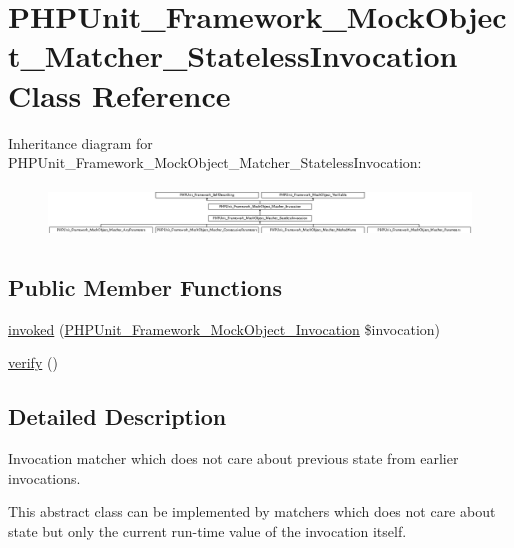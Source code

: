 \hypertarget{class_p_h_p_unit___framework___mock_object___matcher___stateless_invocation}{}\section{P\+H\+P\+Unit\+\_\+\+Framework\+\_\+\+Mock\+Object\+\_\+\+Matcher\+\_\+\+Stateless\+Invocation Class Reference}
\label{class_p_h_p_unit___framework___mock_object___matcher___stateless_invocation}
Inheritance diagram for P\+H\+P\+Unit\+\_\+\+Framework\+\_\+\+Mock\+Object\+\_\+\+Matcher\+\_\+\+Stateless\+Invocation\+:\begin{figure}[H]
\begin{center}
\leavevmode
\includegraphics[height=1.379310cm]{class_p_h_p_unit___framework___mock_object___matcher___stateless_invocation}
\end{center}
\end{figure}
\subsection*{Public Member Functions}
\begin{DoxyCompactItemize}
\item 
\mbox{\hyperlink{class_p_h_p_unit___framework___mock_object___matcher___stateless_invocation_a63f37b06181c9547bc3c225007c34425}{invoked}} (\mbox{\hyperlink{interface_p_h_p_unit___framework___mock_object___invocation}{P\+H\+P\+Unit\+\_\+\+Framework\+\_\+\+Mock\+Object\+\_\+\+Invocation}} \$invocation)
\item 
\mbox{\hyperlink{class_p_h_p_unit___framework___mock_object___matcher___stateless_invocation_aa33600b6a1b28d0c4dfe4d468272aaa4}{verify}} ()
\end{DoxyCompactItemize}


\subsection{Detailed Description}
Invocation matcher which does not care about previous state from earlier invocations.

This abstract class can be implemented by matchers which does not care about state but only the current run-\/time value of the invocation itself.

